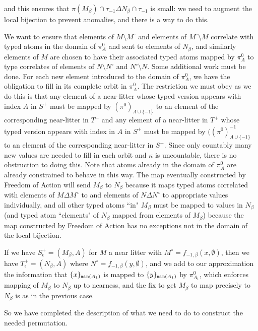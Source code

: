 \documentclass[112pt]{article}
\begin{document}
\begin{description}
and this ensures that $\pi(M_\beta)\cap \tau_{-1} \Delta N_\beta\cap \tau_{-1}$ is small:  we need to augment the local bijection to prevent anomalies, and there is a way to do this.

We want to ensure that elements of $M \setminus M^{\circ}$ and elements of $M^{\circ} \setminus M$ correlate with typed atoms in the domain of $\pi^0_A$ and sent to elements of $N_\beta$, and similarly elements of $M$ are chosen to have their associated typed atoms mapped by $\pi^0_A$ to type correlates of elements of $N\setminus N^\circ$ and $N^\circ \setminus N$.
 Some additional work must be done.  For each new element introduced to the domain of $\pi^0_A$, we have the obligation to fill in its complete orbit in $\pi^0_A$.   The restriction we must obey as we do this is that any element of a near-litter whose typed version appears with index $A$ in $S^+$ must be mapped by $(\pi^0)_{A\cup \{-1\}}$ to an element of the corresponding near-litter in $T^+$ and any element of a near-litter in $T^+$  whose typed version appears with index in $A$ in $S^+$ must be mapped by $((\pi^0)_{A\cup \{-1\}}^{-1}$ to an element of the corresponding near-litter in $S^+$.  Since only countably many new values are needed to fill in each orbit and $\kappa$ is uncountable, there is no obstruction to doing this.  Note that atoms already in the domain of $\pi^0_A$ are already constrained to behave in this way.  The map eventually constructed by Freedom of Action will send
$M_\beta$ to $N_\beta$ because it maps typed atoms correlated with elements of $M \Delta M^\circ$ to and elements of $N \Delta N^{\circ}$ to appropriate values individually, and all other typed atoms ``in" $M_\beta$ must be mapped to values in $N_\beta$ (and typed atom ``elements" of $N_\beta$ mapped from elements of $M_\beta$) because the map constructed by Freedom of Action has no exceptions not in the domain of the local bijection.

If we have $S^+_\epsilon= (M_\beta,A)$ for $M$ a near litter with $M^\circ = f_{-1,\beta}(x,\emptyset)$, then we have $T^+_\epsilon=(N_\beta,A)$
where  $N^\circ = f_{-1,\beta}(y,\emptyset)$, and we add to our approximation the information that $\{x\}_{{\tt min}(A_1)}$ is mapped to 
$\{y\}_{{\tt min}(A_1)}$ by $\pi^0_{A_1}$, which enforces mapping of $M_\beta$ to $N_\beta$ up to nearness, and the fix to get $M_\beta$ to map precisely to $N_\beta$ is as in the previous case.

So we have completed the description of what we need to do to construct the needed permutation.

\end{description}
\end{document}
